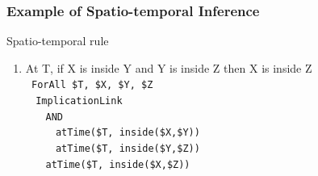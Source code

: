 \documentclass{beamer}
\begin{document}
\frame
{
  \frametitle{Example of Spatio-temporal Inference}
  
  \begin{beamerboxesrounded}{Spatio-temporal rule}
    {\tiny
    \begin{enumerate}
    \item<+-> At T, if X is inside Y and Y is inside Z
      then X is inside Z\\
      {\tt
      ForAll \$T, \$X, \$Y, \$Z\\
      $\ \ \ \ $ImplicationLink\\
      $\ \ \ \ \ \ \ \ $AND\\
      $\ \ \ \ \ \ \ \ \ \ \ \ $atTime(\$T, inside(\$X,\$Y))\\
      $\ \ \ \ \ \ \ \ \ \ \ \ $atTime(\$T, inside(\$Y,\$Z))\\
      $\ \ \ \ \ \ \ \ $atTime(\$T, inside(\$X,\$Z))\\
      }
      
    \end{enumerate}
    }
  \end{beamerboxesrounded}
}
\end{document}
